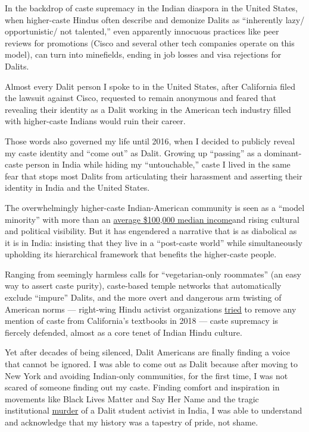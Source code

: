 In the backdrop of caste supremacy in the Indian diaspora in the United
States, when higher-caste Hindus often describe and demonize Dalits as
``inherently lazy/ opportunistic/ not talented,'' even apparently
innocuous practices like peer reviews for promotions (Cisco and several
other tech companies operate on this model), can turn into minefields,
ending in job losses and visa rejections for Dalits.

Almost every Dalit person I spoke to in the United States, after
California filed the lawsuit against Cisco, requested to remain
anonymous and feared that revealing their identity as a Dalit working in
the American tech industry filled with higher-caste Indians would ruin
their career.

Those words also governed my life until 2016, when I decided to publicly
reveal my caste identity and ``come out'' as Dalit. Growing up
``passing'' as a dominant-caste person in India while hiding my
``untouchable,'' caste I lived in the same fear that stops most Dalits
from articulating their harassment and asserting their identity in India
and the United States.

The overwhelmingly higher-caste Indian-American community is seen as a
``model minority'' with more than an
\href{https://www8.gsb.columbia.edu/articles/chazen-global-insights/singular-population-indian-immigrants-america}{average
\$100,000 median income}and rising cultural and political visibility.
But it has engendered a narrative that is as diabolical as it is in
India: insisting that they live in a ``post-caste world'' while
simultaneously upholding its hierarchical framework that benefits the
higher-caste people.

Ranging from seemingly harmless calls for ``vegetarian-only roommates''
(an easy way to assert caste purity), caste-based temple networks that
automatically exclude ``impure'' Dalits, and the more overt and
dangerous arm twisting of American norms --- right-wing Hindu activist
organizations
\href{https://www.nytimes.com/2016/05/06/us/debate-erupts-over-californias-india-history-curriculum.html}{tried}
to remove any mention of caste from California's textbooks in 2018 ---
caste supremacy is fiercely defended, almost as a core tenet of Indian
Hindu culture.

Yet after decades of being silenced, Dalit Americans are finally finding
a voice that cannot be ignored. I was able to come out as Dalit because
after moving to New York and avoiding Indian-only communities, for the
first time, I was not scared of someone finding out my caste. Finding
comfort and inspiration in movements like Black Lives Matter and Say Her
Name and the tragic institutional
\href{https://www.theguardian.com/global-development/2020/feb/19/coming-out-as-dalit-how-one-indian-author-finally-embraced-her-identity}{murder}
of a Dalit student activist in India, I was able to understand and
acknowledge that my history was a tapestry of pride, not shame.

